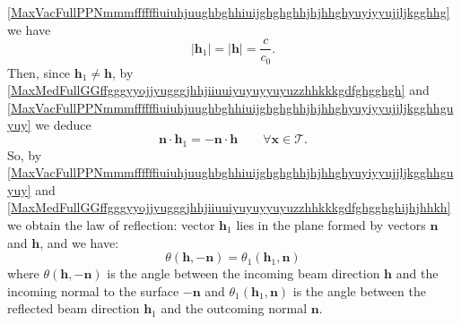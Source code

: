 \documentclass{article}
\theoremstyle{definition}
\theoremstyle{remark}
\renewcommand{\vec}[1]{\mathbf{#1}}
\newcommand{\er}{\eqref}
\newcommand{\er}{\eqref}
\begin{document}
\er{MaxVacFullPPNmmmffffffiuiuhjuughbghhiuijghghghhjhjhhghyuyiyyujjljkgghhg}
we have
\begin{equation}\label{MaxVacFullPPNmmmffffffiuiuhjuughbghhiuijghghghhjhjhhghyuyiyyujjljkgghhguyuy}
|\vec h_1|=|\vec h|=\frac{c}{c_0}.
\end{equation}
Then, since $\vec h_1\neq\vec h$, by
\er{MaxMedFullGGffgggyyojjyugggjhhjiiuuiyuyuyyuyuzzhhkkkgdfghgghgh}
and
\er{MaxVacFullPPNmmmffffffiuiuhjuughbghhiuijghghghhjhjhhghyuyiyyujjljkgghhguyuy}
we deduce
\begin{equation}\label{MaxMedFullGGffgggyyojjyugggjhhjiiuuiyuyuyyuyuzzhhkkkgdfghgghghijhjhhkh}
\vec n\cdot \vec h_1=-\vec n\cdot \vec h\quad\quad\forall\vec
x\in\mathcal{T}.
\end{equation}
So, by
\er{MaxVacFullPPNmmmffffffiuiuhjuughbghhiuijghghghhjhjhhghyuyiyyujjljkgghhguyuy}
and
\er{MaxMedFullGGffgggyyojjyugggjhhjiiuuiyuyuyyuyuzzhhkkkgdfghgghghijhjhhkh}
we obtain the law of reflection: vector $\vec h_1$ lies in the plane
formed by vectors $\vec n$ and $\vec h$, and we have:
\begin{equation}\label{MaxMedFulljhhjjjjj}
\theta\left(\vec h,-\vec n\right)=\theta_1\left(\vec h_1,\vec
n\right)
\end{equation}
where $\theta\left(\vec h,-\vec n\right)$ is the angle between the
incoming beam direction $\vec h$ and the incoming normal to the
surface $-\vec n$ and $\theta_1\left(\vec h_1,\vec n\right)$ is the
angle between the reflected beam direction $\vec h_1$ and the
outcoming normal $\vec n$.
\end{document}
